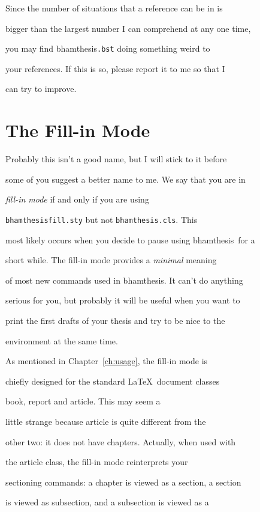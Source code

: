 \documentclass{bhamthesis}
\newcommand{\clsname}{\pkg{bhamthesis}}
\newcommand{\pkg}[1]{\textsf{#1}}
\newcommand{\file}[1]{\texttt{#1}}
\newcommand{\ext}[1]{\texttt{#1}}
\begin{document}
Since the number of situations that a reference can be in is

bigger than the largest number I can comprehend at any one time,

you may find \clsname\texttt.\ext{bst} doing something weird to

your references.  If this is so, please report it to me so that I

can try to improve.





\chapter{The Fill-in Mode}\label{ch:fill-in}

Probably this isn't a good name, but I will stick to it before

some of you suggest a better name to me.  We say that you are in

\emph{fill-in mode} if and only if you are using

\file{bhamthesisfill.sty} but not \file{bhamthesis.cls}.  This

most likely occurs when you decide to pause using \clsname\ for a

short while.  The fill-in mode provides a \emph{minimal} meaning

of most new commands used in \clsname.  It can't do anything

serious for you, but probably it will be useful when you want to

print the first drafts of your thesis and try to be nice to the

environment at the same time.



As mentioned in Chapter~\ref{ch:usage}, the fill-in mode is

chiefly designed for the standard \LaTeX\ document classes

\pkg{book}, \pkg{report} and \pkg{article}.  This may seem a

little strange because \pkg{article} is quite different from the

other two: it does not have chapters.  Actually, when used with

the \pkg{article} class, the fill-in mode reinterprets your

sectioning commands: a chapter is viewed as a section, a section

is viewed as subsection, and a subsection is viewed as a
\end{document}
